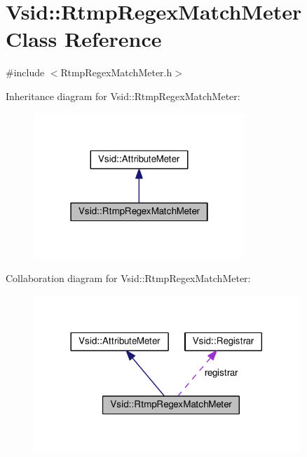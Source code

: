 \hypertarget{class_vsid_1_1_rtmp_regex_match_meter}{\section{Vsid\-:\-:Rtmp\-Regex\-Match\-Meter Class Reference}
\label{class_vsid_1_1_rtmp_regex_match_meter}
}


{\ttfamily \#include $<$Rtmp\-Regex\-Match\-Meter.\-h$>$}



Inheritance diagram for Vsid\-:\-:Rtmp\-Regex\-Match\-Meter\-:
\nopagebreak
\begin{figure}[H]
\begin{center}
\leavevmode
\includegraphics[width=226pt]{class_vsid_1_1_rtmp_regex_match_meter__inherit__graph}
\end{center}
\end{figure}


Collaboration diagram for Vsid\-:\-:Rtmp\-Regex\-Match\-Meter\-:
\nopagebreak
\begin{figure}[H]
\begin{center}
\leavevmode
\includegraphics[width=284pt]{class_vsid_1_1_rtmp_regex_match_meter__coll__graph}
\end{center}
\end{figure}

